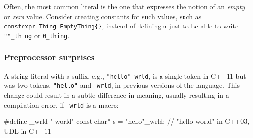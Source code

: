\noindent Often, the most common literal is the one that expresses the notion of
an \emph{empty} or \emph{zero} value. Consider creating constants for
such values, such as
\lstinline!constexpr!~\lstinline!Thing!~\lstinline!EmptyThing{}!, instead of
defining a  just to be able to write
\lstinline!""_thing! or \lstinline!0_thing!.


%
%

\subsubsection[Preprocessor surprises]{Preprocessor surprises}\label{preprocessor-surprises}

A string literal with a suffix, e.g., \lstinline!"hello"_wrld!, is a
single token in C++11 but was two tokens, \lstinline!"hello"! and
\lstinline!_wrld!, in previous versions of the language. This change could
result in a subtle difference in meaning, usually resulting in a
compilation error, if \lstinline!_wrld! is a macro:

\begin{emcppslisting}[emcppserrorlines=2]
#define _wrld " world"
const char* s = "hello"_wrld;  // "hello world" in C++03, UDL in C++11
\end{emcppslisting}

